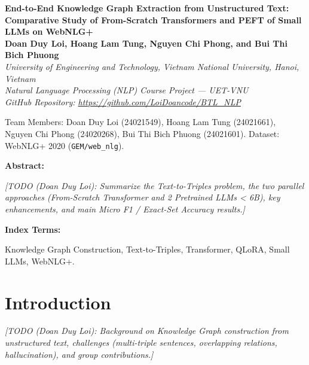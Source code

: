 \documentclass[10pt, a4paper]{article}
\renewenvironment{abstract}{%
  \begin{list}{}{\leftmargin=0.45in \rightmargin=0.45in \listparindent=0pt \parsep=0pt}%
  \item\relax\small\noindent\textbf{Abstract:}\hspace{0.4em}%
}{%
  \end{list}%
}
\newenvironment{IEEEkeywords}{%
  \begin{list}{}{\leftmargin=0.45in \rightmargin=0.45in \listparindent=0pt \parsep=0pt}%
  \item\relax\small\noindent\textbf{Index Terms:}\hspace{0.4em}%
}{%
  \end{list}%
}
\newcommand{\todo}[1]{\par\noindent\textit{[#1]}\par}
\begin{document}
\begin{center}
  {\LARGE\bfseries
    End-to-End Knowledge Graph Extraction from Unstructured Text:\\[3pt]
    Comparative Study of From-Scratch Transformers and PEFT of Small LLMs on WebNLG+
  }\\[14pt]

  {\normalsize\bfseries
    Doan Duy Loi, Hoang Lam Tung, Nguyen Chi Phong, and Bui Thi Bich Phuong
  }\\[6pt]

  {\small\itshape
    University of Engineering and Technology, Vietnam National University, Hanoi, Vietnam
  }\\[8pt]

  {\footnotesize\itshape
    Natural Language Processing (NLP) Course Project --- UET-VNU\\
    GitHub Repository: \url{https://github.com/LoiDoancode/BTL_NLP}
  }
\end{center}

\vspace{6pt}
\noindent\begin{list}{}{\leftmargin=0.45in \rightmargin=0.45in}
  \item\relax\footnotesize
  Team Members: Doan Duy Loi (24021549), Hoang Lam Tung (24021661), Nguyen Chi Phong (24020268), Bui Thi Bich Phuong (24021601). Dataset: WebNLG+ 2020 (\texttt{GEM/web\_nlg}).
\end{list}
\vspace{2pt}
\noindent{\color{black!65}\rule{\textwidth}{0.8pt}}
\vspace{6pt}

\begin{abstract}
\todo{TODO (Doan Duy Loi): Summarize the Text-to-Triples problem, the two parallel approaches (From-Scratch Transformer and 2 Pretrained LLMs < 6B), key enhancements, and main Micro F1 / Exact-Set Accuracy results.}
\end{abstract}

\begin{IEEEkeywords}
Knowledge Graph Construction, Text-to-Triples, Transformer, QLoRA, Small LLMs, WebNLG+.
\end{IEEEkeywords}

\vspace{6pt}

\section{Introduction}
\todo{TODO (Doan Duy Loi): Background on Knowledge Graph construction from unstructured text, challenges (multi-triple sentences, overlapping relations, hallucination), and group contributions.}
\end{document}
